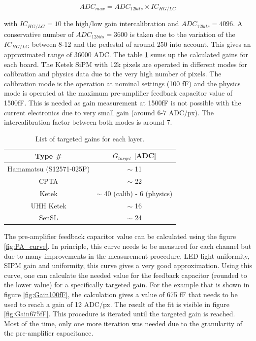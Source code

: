 \begin{equation}
  ADC_{max} = ADC_{12 bits} \times IC_{HG/LG}
\end{equation}

with $IC_{HG/LG} = 10$ the high/low gain intercalibration and $ADC_{12 bits} = 4096$. A conservative number of $ADC_{12 bits} = 3600$ is taken due to the variation of the $IC_{HG/LG}$ between 8-12 and the pedestal of around 250 into account. This gives an approximated range of 36000 ADC. The table \ref{table:GainTarget_SiPM} sums up the calculated gains for each board. The Ketek SiPM with 12k pixels are operated in different modes for calibration and physics data due to the very high number of pixels. The calibration mode is the operation at nominal settings (100 fF) and the physics mode is operated at the maximum pre-amplifier feedback capacitor value of 1500fF. This is needed as gain measurement at 1500fF is not possible with the current electronics due to very small gain (around 6-7 ADC/px). The intercalibration factor between both modes is around 7.

\begin{table}[htb!]
  \centering
  \caption{List of targeted gains for each layer.}
  \label{table:GainTarget_SiPM}
  \begin{tabular}{@{} cc @{}}
    \hline
    Type \# & $G_{target}$ [ADC] \\
    \hline
    Hamamatsu (S12571-025P) & $\sim$ 11\\
    CPTA & $\sim$ 22\\
    Ketek & $\sim$ 40 (calib) - 6 (physics)\\
    UHH Ketek & $\sim$ 16\\
    SenSL & $\sim$ 24\\
    \hline
  \end{tabular}
\end{table}

The pre-amplifier feedback capacitor value can be calculated using the figure \ref{fig:PA_curve}. In principle, this curve needs to be measured for each channel but due to many improvements in the measurement procedure, LED light uniformity, SIPM gain and uniformity, this curve gives a very good approximation. Using this curve, one can calculate the needed value for the feedback capacitor (rounded to the lower value) for a specifically targeted gain. For the example that is shown in figure \ref{fig:Gain100fF}, the calculation gives a value of 675 fF that needs to be used to reach a gain of 12 ADC/px. The result of the fit is visible in figure \ref{fig:Gain675fF}. This procedure is iterated until the targeted gain is reached. Most of the time, only one more iteration was needed due to the granularity of the pre-amplifier capacitance.

